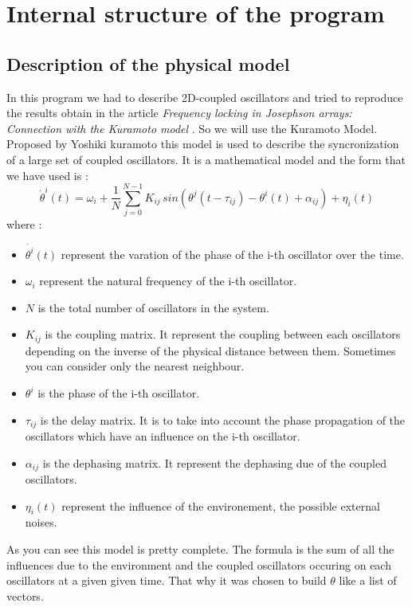 \documentclass[1pt, a4paper]{article}
\begin{document}
\section{Internal structure of the program}
\label{sec:2}
\subsection{Description of the physical model}
\label{subs:2.1}
In this program we had to describe 2D-coupled oscillators and tried to reproduce the results obtain in the article \textit{Frequency locking in Josephson arrays: Connection with the Kuramoto model} \cite{josephson}. So we will use the Kuramoto Model. Proposed by Yoshiki kuramoto this model is used to describe the syncronization of a large set of coupled oscillators. It is a mathematical model and the form that we have used is : 
\[\dot{\theta}^i(t)=\omega_ i + \dfrac{1}{N}\sum^{N-1}_{j=0}K_{ij}\,sin(\theta^j(t-\tau_{ij})-\theta^i(t)+\alpha_{ij}) + \eta_i(t)\]
where :
\begin{itemize}[itemsep=0pt]
\item $\dot{\theta^i}(t)$ represent the varation of the phase of the i-th oscillator over the time.
\item $\omega_i$ represent the natural frequency of the i-th oscillator.
\item $N$ is the total number of oscillators in the system.
\item $K_{ij}$ is the coupling matrix. It represent the coupling between each oscillators depending on the inverse of the physical distance between them. Sometimes you can consider only the nearest neighbour.
\item $\theta^i$ is the phase of the i-th oscillator.
\item $\tau_{ij}$ is the delay matrix. It is to take into account the phase propagation of the oscillators which have an influence on the i-th oscillator.
\item $\alpha_{ij}$ is the dephasing matrix. It represent the dephasing due of the coupled oscillators.
\item $\eta_i(t)$ represent the influence of the environement, the possible external noises.
\end{itemize}
As you can see this model is pretty complete. The formula is the sum of all the influences due to the environment and the coupled oscillators occuring on each oscillators at a given given time. That why it was chosen to build $\theta$ like a list of vectors.
\end{document}
